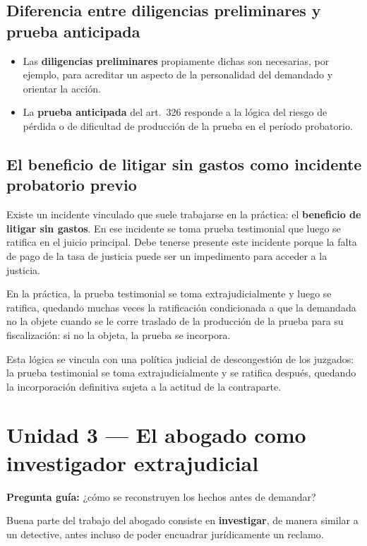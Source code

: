 \documentclass[12pt,oneside]{book}
\begin{document}
\subsection{Diferencia entre diligencias preliminares y prueba anticipada}

\begin{itemize}
    \item Las \textbf{diligencias preliminares} propiamente dichas son necesarias, por ejemplo, para acreditar un aspecto de la personalidad del demandado y orientar la acción.
    \item La \textbf{prueba anticipada} del art.\ 326 responde a la lógica del riesgo de pérdida o de dificultad de producción de la prueba en el período probatorio.
\end{itemize}

\subsection{El beneficio de litigar sin gastos como incidente probatorio previo}

Existe un incidente vinculado que suele trabajarse en la práctica: el \textbf{beneficio de litigar sin gastos}. En ese incidente se toma prueba testimonial que luego se ratifica en el juicio principal. Debe tenerse presente este incidente porque la falta de pago de la tasa de justicia puede ser un impedimento para acceder a la justicia.

En la práctica, la prueba testimonial se toma extrajudicialmente y luego se ratifica, quedando muchas veces la ratificación condicionada a que la demandada no la objete cuando se le corre traslado de la producción de la prueba para su fiscalización: si no la objeta, la prueba se incorpora.

Esta lógica se vincula con una política judicial de descongestión de los juzgados: la prueba testimonial se toma extrajudicialmente y se ratifica después, quedando la incorporación definitiva sujeta a la actitud de la contraparte.

\section{Unidad 3 --- El abogado como investigador extrajudicial}

\textbf{Pregunta guía:} ¿cómo se reconstruyen los hechos antes de demandar?

Buena parte del trabajo del abogado consiste en \textbf{investigar}, de manera similar a un detective, antes incluso de poder encuadrar jurídicamente un reclamo.
\end{document}

